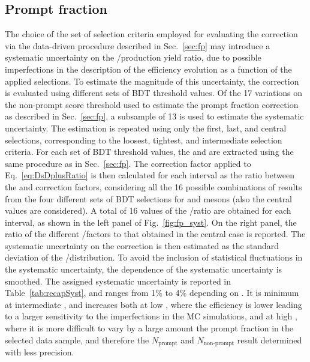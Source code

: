 \subsection{Prompt fraction}
The choice of the set of selection criteria employed for evaluating the \fp correction via the data-driven procedure described in Sec.~\ref{sec:fp} may introduce a systematic uncertainty on the \ds/\dpl production yield ratio, due to possible imperfections in the description of the efficiency evolution as a function of the applied selections. To estimate the magnitude of this uncertainty, the \fp correction is evaluated using different sets of BDT threshold values. Of the 17 variations on the non-prompt score threshold used to estimate the prompt fraction correction as described in Sec.~\ref{sec:fp}, a subsample of 13 is used to estimate the systematic uncertainty. The \fp estimation is repeated using only the first, last, and central selections, corresponding to the loosest, tightest, and intermediate selection criteria. For each set of BDT threshold values, the \fpds and \fpdpl are extracted using the same procedure as in Sec.~\ref{sec:fp}. The correction factor applied to Eq.~\ref{eq:DsDplusRatio} is then calculated for each \pt interval as the ratio between the \fpds and \fpdpl correction factors, considering all the 16 possible combinations of results from the four different sets of BDT selections for \ds and \dpl mesons (also the central values are considered). A total of 16 values of the \fpds/\fpdpl ratio are obtained for each \pt interval, as shown in the left panel of Fig.~\ref{fig:fp_syst}. On the right panel, the ratio of the different \fpds/\fpdpl factors to that obtained in the central case is reported. The systematic uncertainty on the \fp correction is then estimated as the standard deviation of the \fpds/\fpdpl distribution. To avoid the inclusion of statistical fluctuations in the systematic uncertainty, the \pt dependence of the systematic uncertainty is smoothed. The assigned systematic uncertainty is reported in Table~\ref{tab:recapSyst}, and ranges from 1\% to 4\% depending on \pt. It is minimum at intermediate \pt, and increases both at low \pt, where the efficiency is lower leading to a larger sensitivity to the imperfections in the MC simulations, and at high \pt, where it is more difficult to vary by a large amount the prompt fraction in the selected data sample, and therefore the $N_\mathrm{prompt}$ and $N_\mathrm{non\text{-}prompt}$ result determined with less precision.

